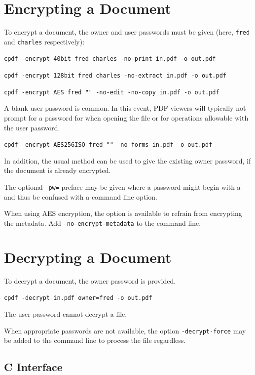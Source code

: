 \documentclass{book}
\begin{document}
  \section{Encrypting a Document}
  To encrypt a document, the owner and user passwords must be given (here, \texttt{fred} and \texttt{charles} respectively):
  \begin{framed}
    \noindent\small\verb!cpdf -encrypt 40bit fred charles -no-print in.pdf -o out.pdf!

    \vspace{1.5mm}
    \noindent\small\verb!cpdf -encrypt 128bit fred charles -no-extract in.pdf -o out.pdf!

    \vspace{1.5mm}
    \noindent\small\verb!cpdf -encrypt AES fred "" -no-edit -no-copy in.pdf -o out.pdf!
  \end{framed}
  \noindent A blank user password is
common. In this event, PDF viewers will typically not prompt for a
password for when opening the file or for operations allowable with the user password.
  \begin{framed}
    \vspace{1.5mm}
    \noindent\small\verb!cpdf -encrypt AES256ISO fred "" -no-forms in.pdf -o out.pdf!
  \end{framed}
\noindent In addition, the usual method can be used to give the existing owner
password, if the document is already encrypted.

The optional \texttt{-pw=} preface may be given where a password might begin with a \texttt{-} and thus be confused with a command line option.

When using AES encryption, the option is available to refrain from encrypting the
metadata. Add \texttt{-no-encrypt-metadata} to the command line.

  \section{Decrypting a Document}
  To decrypt a document, the owner password is provided.
  \begin{framed}
    \noindent\small\verb!cpdf -decrypt in.pdf owner=fred -o out.pdf!
  \end{framed}
  \noindent The user password cannot decrypt a file.

When appropriate passwords are not available, the option \texttt{-decrypt-force} may be added to the command line to process the file regardless.


\begin{cpdflib}
\clearpage
\section*{C Interface}
\begin{small}\tt

\end{small}
\end{cpdflib}
\end{document}
